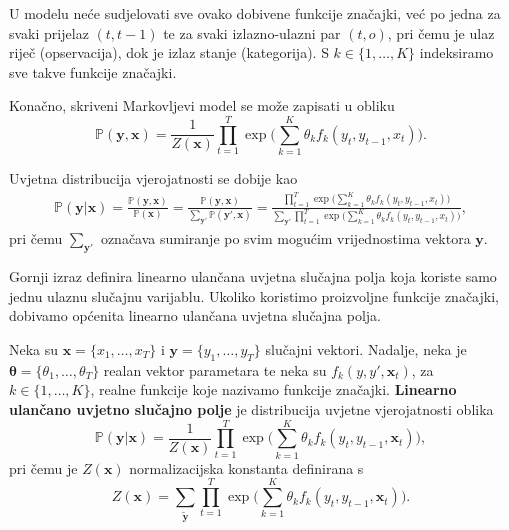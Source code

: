 \documentclass[a4paper,twoside,12pt]{memoir} %
\newcommand{\tb}{\textbf}
\begin{document}
	U modelu neće sudjelovati sve ovako dobivene funkcije značajki, već po jedna za svaki prijelaz $(t, t-1)$ te za svaki izlazno-ulazni par $(t, o)$, pri čemu je ulaz riječ (opservacija), dok je izlaz stanje (kategorija). S $k \in \{1, \ldots, K\}$ indeksiramo sve takve funkcije značajki.

	Konačno, skriveni Markovljevi model se može zapisati u obliku
	\begin{equation}\label{hmm}
	\mathbb{P}(\mathbf{y}, \mathbf{x})  = \frac{1}{Z(\mathbf{x})} \prod_{t=1}^{T}\exp \bigg(\sum_{k=1}^{K} \theta_k f_k(y_t, y_{t-1}, x_t)\bigg).
	\end{equation}

	Uvjetna distribucija vjerojatnosti se dobije kao
	\begin{align*}
	\mathbb{P}(\mathbf{y}|\mathbf{x})
	= \frac
	{\mathbb{P}(\mathbf{y},\mathbf{x})}
	{\mathbb{P}(\mathbf{x})}
	= \frac
	{\mathbb{P}(\mathbf{y},\mathbf{x})}
	{\sum\limits_{\mathbf{y}'}\mathbb{P}(\mathbf{y}', \mathbf{x})}
	= \frac
	{\prod\limits_{t=1}^{T}\exp \bigg(\sum\limits_{k=1}^{K} \theta_k f_k(y_t, y_{t-1}, x_t)\bigg)}
	{\sum\limits_{\mathbf{y}'}\prod\limits_{t=1}^{T}\exp \bigg(\sum\limits_{k=1}^{K} \theta_k f_k(y_t, y_{t-1}, x_t)\bigg)},
	\end{align*}
	pri čemu $\sum\limits_{\mathbf{y}'}$ označava sumiranje po svim mogućim vrijednostima vektora $\mathbf{y}$.

	\bigskip

	Gornji izraz definira linearno ulančana uvjetna slučajna polja koja koriste samo jednu ulaznu slučajnu varijablu. Ukoliko koristimo proizvoljne funkcije značajki, dobivamo općenita linearno ulančana uvjetna slučajna polja.

	\begin{defn}
		Neka su $\mathbf{x} = \{x_1, \ldots, x_T\}$ i $\mathbf{y} = \{y_1, \ldots, y_T\}$ slučajni vektori. Nadalje, neka je $\bm{\theta} = \{\theta_1, \ldots, \theta_T\}$ realan vektor parametara te neka su $f_k(y, y', \mathbf{x}_t)$, za $k \in \{1, \ldots, K\}$, realne funkcije koje nazivamo funkcije značajki. \tb{Linearno ulančano uvjetno slučajno polje} je distribucija uvjetne vjerojatnosti oblika
		\begin{equation}\label{linear_crf}
		\mathbb{P}(\mathbf{y} | \mathbf{x})  = \frac{1}{Z(\mathbf{x})} \prod_{t=1}^{T} \exp \bigg(\sum_{k=1}^{K} \theta_k f_k(y_t, y_{t-1}, \mathbf{x}_t)\bigg),
		\end{equation}
		pri čemu je $Z(\mathbf{x})$ normalizacijska konstanta definirana s
		\begin{equation*}
		Z(\mathbf{x}) = \sum_{\tilde{\mathbf{y}}} \prod_{t=1}^{T} \exp \bigg(\sum_{k=1}^{K} \theta_k f_k(y_t, y_{t-1}, \mathbf{x}_t)\bigg).
		\end{equation*}
	\end{defn}
\end{document}
